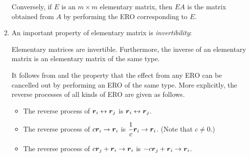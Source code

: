\begin{enumerate}
\begin{theorem}
Conversely, if \(E\) is an \(m\times m\) elementary matrix, then \(EA\) is the
matrix obtained from \(A\) by performing the ERO corresponding to \(E\).
\end{theorem}
\item An important property of elementary matrix is \emph{invertibility}:
\begin{proposition}
\label{prp:elementary-matrix-inv}
Elementary matrices are invertible. Furthermore, the inverse of an elementary
matrix is an elementary matrix of the same type.
\end{proposition}
\begin{pf}
It follows from  and the property that
the effect from any ERO can be cancelled out by performing an ERO of the same
type. More explicitly, the reverse processes of all kinds of ERO are given as
follows.
\begin{itemize}
\item The reverse process of \(\vb*{r}_{i}\leftrightarrow \vb*{r}_{j}\) is
\(\vb*{r}_{i}\leftrightarrow \vb*{r}_{j}\).
\item The reverse process of \(c\vb*{r}_{i}\to \vb*{r}_{i}\) is
\(\displaystyle \frac{1}{c}\vb*{r}_{i}\to\vb*{r}_{i}\). (Note that \(c\ne 0\).)
\item The reverse process of \(c\vb*{r}_{j}+\vb*{r}_{i}\to \vb*{r}_{i}\) is
\(-c\vb*{r}_{j}+\vb*{r}_{i}\to \vb*{r}_{i}\).
\end{itemize}
\end{pf}
\end{enumerate}

